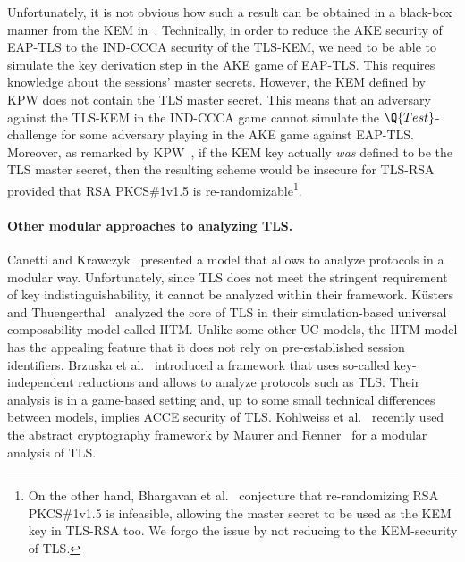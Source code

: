 Unfortunately,
it is not obvious how such a result can be obtained in a black-box manner from the KEM in~\cite{C:KraPatWee13}.
Technically,
in order to reduce the AKE security of EAP-TLS to the IND-CCCA security of the TLS-KEM,
we need to be able to simulate the key derivation step in the AKE game of EAP-TLS.
This requires knowledge about the sessions' master secrets.
However,
the KEM defined by KPW does not contain the TLS master secret. 
This means that an adversary against the TLS-KEM in the IND-CCCA game
cannot simulate the $\Q{Test}$-challenge for some adversary playing in the AKE game against EAP-TLS. 
Moreover,
as remarked by KPW~\cite[Remark~4]{C:KraPatWee13},
if the KEM key actually \emph{was} defined to be the TLS master secret,
then the resulting scheme would be insecure for TLS-RSA provided that RSA PKCS\#1v1.5 is re-randomizable\footnote{On the other hand, 
Bhargavan et al.~\cite{C:BFKPSZ14}
conjecture that re-randomizing RSA PKCS\#1v1.5 is infeasible, 
allowing the master secret to be used as the KEM key in TLS-RSA too.
We forgo the issue by not reducing to the KEM-security of TLS. 
}.

\paragraph{Other modular approaches to analyzing TLS.}
Canetti and Krawczyk~\cite{EC:CanKra01} presented a model that allows to analyze protocols in a modular way.
Unfortunately,
since TLS does not meet the stringent requirement of key indistinguishability, it cannot be analyzed within their framework.
K{\"u}sters and Thuengerthal~\cite{CCS:KusTue11} analyzed the core of TLS in their simulation-based universal composability model
called IITM.
Unlike some other UC models,
the IITM model has the appealing feature that it does not rely on pre-established session identifiers. 
Brzuska et al.~\cite{BrzuskaFSWW:2012:less_is_more} introduced a framework that uses so-called key-independent reductions and allows to analyze protocols such as TLS. 
Their analysis is in a game-based setting and,
up to some small technical differences between models,
implies ACCE security of TLS.
Kohlweiss et al.~\cite{EPRINT:KMOTV14} recently used the abstract cryptography framework by Maurer and Renner~\cite{ICS:MauRen11} for a modular analysis of TLS.

